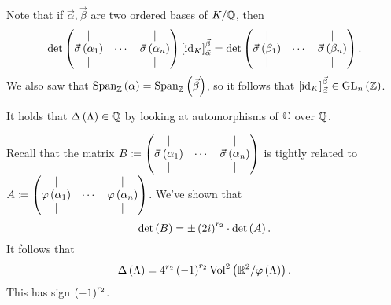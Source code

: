\documentclass[11pt]{article}
\begin{document}
\begin{remark}
Note that if $\vec{\alpha}, \vec{\beta}$ are two ordered bases of $K/\mathbb{Q}$, then
\[\det\begin{pmatrix}\vert & & \vert \\ \vec{\sigma}\left( \alpha_1 \right) & \cdots & \vec{\sigma}\left( \alpha_n \right) \\ \vert & & \vert\end{pmatrix} \left[ \mathrm{id}_K \right]^{\vec{\beta}}_{\vec{\alpha}} = \det\begin{pmatrix}\vert & & \vert \\ \vec{\sigma}\left( \beta_1 \right) & \cdots & \vec{\sigma}\left( \beta_n \right) \\ \vert & & \vert\end{pmatrix} \text{.}\]
We also saw that $\operatorname{Span}_{\mathbb{Z}}\left( \alpha \right) = \operatorname{Span}_{\mathbb{Z}}\left( \vec{\beta} \right)$, so it follows that $\left[ \mathrm{id}_K \right]^{\vec{\beta}}_{\vec{\alpha}} \in \mathrm{GL}_n\left( \mathbb{Z} \right)$.
\end{remark}

\begin{remark}
It holds that $\Delta\left( \Lambda \right) \in \mathbb{Q}$ by looking at automorphisms of $\mathbb{C}$ over $\mathbb{Q}$.
\end{remark}

\begin{remark}
Recall that the matrix $B \coloneqq \begin{pmatrix}\vert & & \vert \\ \vec{\sigma}\left( \alpha_1 \right) & \cdots & \vec{\sigma}\left( \alpha_n \right) \\ \vert & & \vert\end{pmatrix}$ is tightly related to $A \coloneqq \begin{pmatrix}\vert & & \vert \\ \varphi\left( \alpha_1 \right) & \cdots & \varphi\left( \alpha_n \right) \\ \vert & & \vert\end{pmatrix}$. We've shown that
\[\det\left( B \right) = \pm \left( 2 i \right)^{r_2} \cdot \det\left( A \right) \text{.}\]
It follows that
\[\Delta\left( \Lambda \right) = 4^{r_2} \left( -1 \right)^{r_2} \mathrm{Vol}^2\left( \mathbb{R}^2 / \varphi\left( \Lambda \right) \right) \text{.}\]
This has sign $\left( -1 \right)^{r_2}$.
\end{remark}
\end{document}
